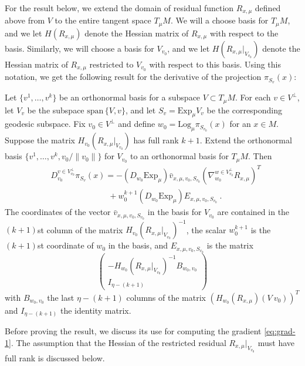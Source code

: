 \documentclass[final]{svjour3}
\newcommand{\Span}{\mathrm{span}\,}
\newcommand{\Exp}{\mathrm{Exp}}
\newcommand{\Log}{\mathrm{Log}}
\newcommand{\Hess}{H}
\begin{document}
For the result below, we extend the domain of residual function $R_{x,\mu}$
defined above from $V$ to the entire tangent space $T_\mu M$.
We will a choose basis for $T_\mu M$, and we let $\Hess(R_{x,\mu})$
denote the Hessian matrix of $R_{x,\mu}$ with respect to the basis. Similarly,
we will choose a basis for $V_{v_0}$, and
we let $\Hess(R_{x,\mu}|_{V_{v_0}})$ denote the Hessian matrix of $R_{x,\mu}$
restricted to $V_{v_0}$ with respect to this basis. Using this notation, we 
get the following result for the derivative of the projection $\pi_{S_v}(x)$:
\begin{proposition}
    Let $\{v^1,\ldots,v^k\}$ be an orthonormal basis for a subspace $V\subset T_\mu M$. 
    For each $v\in V^\perp$, let $V_v$ be the subspace $\Span\{V,v\}$, and
    let $S_v=\Exp_\mu V_v$ be the corresponding geodesic subspace. 
    Fix $v_0\in V^\perp$ and define $w_0=\Log_\mu\pi_{S_{v_0}}(x)$ for an
    $x\in M$. Suppose the matrix $\Hess_{v_0}(R_{x,\mu}|_{V_{v_0}})$ has full rank $k+1$. Extend the
    orthonormal basis $\{v^1,\ldots,v^k,v_0/\|v_0\|\}$
    for $V_{v_0}$ to an orthonormal basis for 
    $T_\mu M$. Then
    \begin{equation}
        \begin{split}
        &D^{v\in V_{v_0}^\perp}_{v_0}\pi_{S_v}(x)
        =
        -(D_{w_0}\Exp_\mu)\bar{v}_{x,\mu,v_0,S_{v_0}}
        \left( 
        \nabla_{w_0}^{w\in V_{v_0}^\perp} R_{x,\mu}
        \right)^T
        \\
        &\qquad\qquad\qquad\quad
        +w_0^{k+1}(D_{w_0}\Exp_\mu)E_{x,\mu,v_0,S_{v_0}}
        \ .
        \end{split}
        \label{eq:grad-proj}
    \end{equation}
    The coordinates of the vector $\bar{v}_{x,\mu,v_0,S_{v_0}}$
    in the basis for $V_{v_0}$ are contained in the $(k+1)$st column of 
    the matrix $\Hess_{v_0}(R_{x,\mu}|_{V_{v_0}})^{-1}$, the scalar $w_0^{k+1}$
    is the $(k+1)$st coordinate of $w_0$ in the basis, and
    $E_{x,\mu,v_0,S_{v_0}}$ is the matrix
    \begin{equation*}
\begin{pmatrix}
            -\Hess_{w_0}\left(R_{x,\mu}|_{V_{v_0}}\right)^{-1}B_{w_0,v_0} \\
            I_{\eta-(k+1)}
        \end{pmatrix}
    \end{equation*}
    with $B_{w_0,v_0}$ the last $\eta-(k+1)$ columns of 
    the matrix
    $(\Hess_{w_0}\left(R_{x,\mu}\right)(V\ v_0))^T$
    and
    $I_{\eta-(k+1)}$
    the identity matrix.
    \label{prop:grad-proj}
\end{proposition}
Before proving the result, we discuss its use for computing the gradient
\eqref{eq:grad-1}. 
The assumption that the Hessian of the restricted residual $R_{x,\mu}|_{V_{v_0}}$ 
must have full rank is discussed below.
\end{document}
